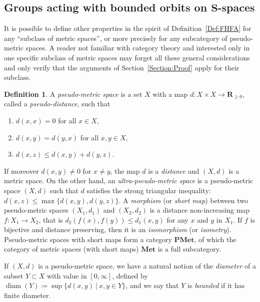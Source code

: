 \documentclass[a4paper]{article}
\newcommand{\PH}[1]{\todo[color={blue!33},size=small]{\textbf{PH :} #1}}
\theoremstyle{definition}
\newtheorem{defn}[lem]{Definition}
\DeclareMathOperator\diam{diam}
\newcommand*{\field}[1]{\mathbf{#1}}
\newcommand*{\category}[1]{\textbf{#1}}
\newcommand*{\PMet}{\category{PMet}}
\newcommand*{\R}{\field{R}}
\newcommand{\setst}[2]{\{#1\ |\ #2\}}
\begin{document}
\subsection{Groups acting with bounded orbits on \texorpdfstring{$\category S$}{\textbf{S}}-spaces}
It is possible to define other properties in the spirit of Definition~\ref{Def:FHFA} for any ``subclass of metric spaces'', or more precisely for any subcategory of pseudo-metric spaces.
A reader not familiar with category theory and interested only in one specific subclass of metric spaces may forget all these general considerations and only verify that the arguments of Section~\ref{Section:Proof} apply for their subclass.
%
%
\begin{defn}\label{Def:Distance}
A \emph{pseudo-metric space} is a set $X$ with a map $d\colon X\times X\to \R_{\geq0}$, called a \emph{pseudo-distance}, such that
\begin{enumerate}
\item $d(x,x)=0$ for all $x\in X$,
\item $d(x,y)=d(y,x)$ for all $x,y \in X$,
\item $d(x,z)\leq d(x,y)+d(y,z)$.
\end{enumerate}
\end{defn}
%
%
If moreover $d(x,y)\neq 0$ for $x\neq y$, the map $d$ is a \emph{distance} and $(X,d)$ is a metric space.
On the other hand, an \emph{ultra-pseudo-metric space} is a pseudo-metric space $(X,d)$ such that $d$ satisfies the strong triangular inequality: $d(x,z)\leq \max\{d(x,y),d(y,z)\}$.\PH{Ajouté le rappel de l'inégalité.}
A \emph{morphism} (or \emph{short map}) between two pseudo-metric spaces $(X_1,d_1)$ and $(X_2,d_2)$ is a distance non-increasing map $f\colon X_1\to X_2$, that is $d_2(f(x),f(y))\leq d_1(x,y)$ for any $x$ and $y$ in $X_1$.
If $f$ is bijective and distance preserving, then it is an \emph{isomorphism} (or \emph{isometry}).
Pseudo-metric spaces with short maps form a category $\PMet$, of which the category of metric spaces (with short maps) $\category{Met}$ is a full subcategory.

If $(X,d)$ is a pseudo-metric space, we have a natural notion of the  \emph{diameter} of a subset $Y\subset X$ with value in $[0,\infty]$, defined by $\diam(Y)\coloneqq\sup\setst{d(x,y)}{x,y\in Y}$, and we say that $Y$ is \emph{bounded} if it has finite diameter.
%
%
\end{document}
